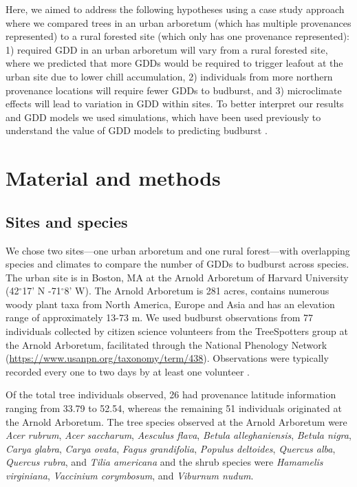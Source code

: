 \documentclass{article}\usepackage[]{graphicx}\usepackage[]{color}
\begin{document}
Here, we aimed to address the following hypotheses using a case study approach where we compared trees in an urban arboretum (which has multiple provenances represented) to a rural forested site (which only has one provenance represented): 1) required GDD in an urban arboretum will vary from a rural forested site, where we predicted that more GDDs would be required to trigger leafout at the urban site due to lower chill accumulation, 2) individuals from more northern provenance locations will require fewer GDDs to budburst, and 3) microclimate effects will lead to variation in GDD within sites. To better interpret our results and GDD models we used simulations, which have been used previously to understand the value of GDD models to predicting budburst \citep[e.g.,][]{Hunter1992}.

\section{Material and methods}
\subsection{Sites and species}
We chose two sites---one urban arboretum and one rural forest---with overlapping species and climates to compare the number of GDDs to budburst across species. The urban site is in Boston, MA at the Arnold Arboretum of Harvard University (42$^{\circ}$17' N -71$^{\circ}$8' W). The Arnold Arboretum is 281 acres, contains numerous woody plant taxa from North America, Europe and Asia and has an elevation range of approximately 13-73 m. We used budburst observations \citep[i.e., defined as the `beginning of sprouting or bud breaking; shoot emergence' as BBCH scale 07, see][]{Finn2007} from 77 individuals collected by citizen science volunteers from the TreeSpotters group at the Arnold Arboretum, facilitated through the National Phenology Network (\url{https://www.usanpn.org/taxonomy/term/438}). Observations were typically recorded every one to two days by at least one volunteer \citep{Denny2014}.

Of the total tree individuals observed, 26 had provenance latitude information ranging from 33.79 to 52.54, whereas the remaining 51 individuals originated at the Arnold Arboretum. The tree species observed at the Arnold Arboretum were \textit{Acer rubrum}, \textit{Acer saccharum}, \textit{Aesculus flava}, \textit{Betula alleghaniensis}, \textit{Betula nigra}, \textit{Carya glabra}, \textit{Carya ovata}, \textit{Fagus grandifolia}, \textit{Populus deltoides}, \textit{Quercus alba}, \textit{Quercus rubra}, and \textit{Tilia americana} and the shrub species were \textit{Hamamelis virginiana}, \textit{Vaccinium corymbosum}, and \textit{Viburnum nudum}. 
\end{document}
